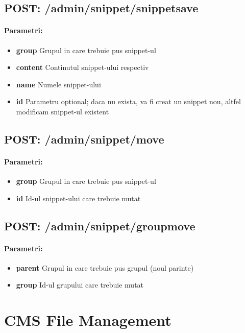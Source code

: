  \subsection*{POST: /admin/snippet/snippetsave}

\paragraph{Parametri:}
\begin{itemize}
\item \textbf{group}
 Grupul in care trebuie pus snippet-ul
\item \textbf{content}
 Continutul snippet-ului respectiv
\item \textbf{name}
 Numele snippet-ului
\item \textbf{id}
 Parametru optional; daca nu exista, va fi creat un snippet nou, altfel modificam snippet-ul existent
 \end{itemize}
 \subsection*{POST: /admin/snippet/move}

\paragraph{Parametri:}
\begin{itemize}
\item \textbf{group}
 Grupul in care trebuie pus snippet-ul
\item \textbf{id}
 Id-ul snippet-ului care trebuie mutat
 \end{itemize}
 \subsection*{POST: /admin/snippet/groupmove}

\paragraph{Parametri:}
\begin{itemize}
\item \textbf{parent}
 Grupul in care trebuie pus grupul (noul parinte)
\item \textbf{group}
 Id-ul grupului care trebuie mutat
 \end{itemize}
 

\section{CMS File Management}

